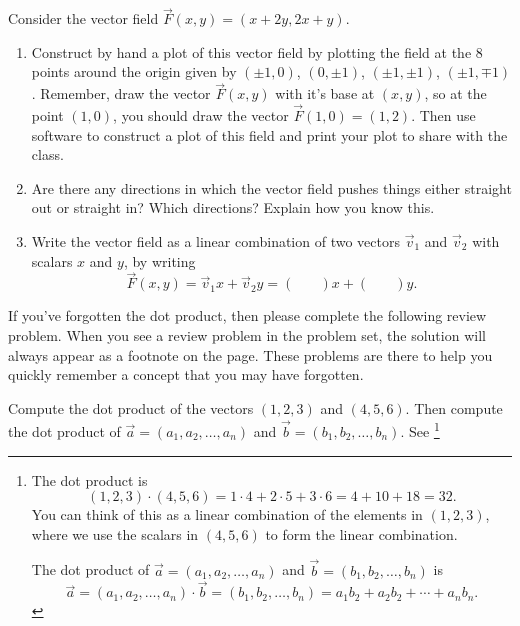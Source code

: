 \begin{problem}\label{linear combination first vector field}
 Consider the vector field $\vec F(x,y) = (x+2y,2x+y)$.  
\begin{enumerate}
 \item Construct by hand a plot of this vector field by plotting the field at the 8 points around the origin given by 
$(\pm 1, 0)$, 
$(0, \pm 1)$, 
$(\pm 1, \pm 1)$, 
$(\pm 1, \mp 1)$.  
Remember, draw the vector $\vec F(x,y)$ with it's base at $(x,y)$, so at the point $(1,0)$, you should draw the vector $\vec F(1,0) = (1,2)$.  %
Then use software to construct a plot of this field and print your plot to share with the class.  
 \item Are there any directions in which the vector field pushes things either straight out or straight in?  Which directions? Explain how you know this.
 \item
 Write the vector field as a linear combination of two vectors $\vec v_1$ and $\vec v_2$ with scalars $x$ and $y$, by writing
$$\vec F(x,y) = \vec v_1 x+\vec v_2 y = 
\begin{pmatrix}
 \quad\\ \quad
\end{pmatrix}
x+
\begin{pmatrix}
\quad \\ \
\end{pmatrix}
y.$$
\end{enumerate}

\end{problem}



If you've forgotten the dot product, then please complete the following review problem. When you see a review problem in the problem set, the solution will always appear as a footnote on the page.  These problems are there to help you quickly remember a concept that you may have forgotten.



\begin{review*}
Compute the dot product of the vectors $(1,2,3)$ and $(4,5,6)$.  Then compute the dot product of 
$\vec a = (a_1,a_2,\ldots, a_n)$ and 
$\vec b = (b_1,b_2,\ldots, b_n)$.  See \footnote{
The dot product is $$(1,2,3)\cdot(4,5,6) = 1\cdot 4+2\cdot 5+3\cdot 6 = 4+10+18=32.$$ You can think of this as a linear combination of the elements in $(1,2,3)$, where we use the scalars in $(4,5,6)$ to form the linear combination.  

The dot product of
$\vec a = (a_1,a_2,\ldots, a_n)$ and 
$\vec b = (b_1,b_2,\ldots, b_n)$ is
$$\vec a = (a_1,a_2,\ldots, a_n)\cdot\vec b = (b_1,b_2,\ldots, b_n)
=a_1b_2+a_2b_2+\cdots+a_nb_n.
$$
} 
\end{review*}



